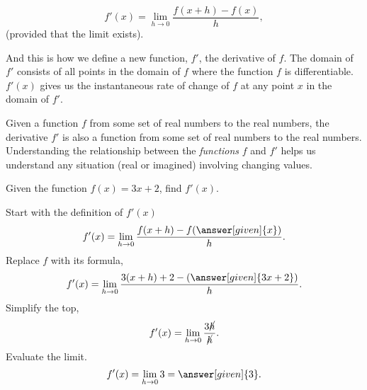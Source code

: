 \documentclass{ximera}
\begin{document}
\[
f'(x) = \lim_{h\to 0}\frac{f(x+h)-f(x)}{h},
\]
(provided that the limit exists).

And this is how we define a new function, $f'$, the derivative of $f$. The domain of $f'$ consists of all points in the domain of $f$ where the function $f$ is differentiable.
$f'(x)$ gives us the instantaneous rate of change of $f$ at any point $x$ in the domain of $f'$.\\
\begin{comment}
\begin{warning}
  The notation:
  \begin{quote}
  $f'(a)$ means take the derivative of $f$ first, then evaluate at
    $x=a$.
  \end{quote}
  In other words, given $f$ a function of $x$
  \[
  f'(a) = \eval{\ddx f(x)}_{x=a}.
  \]
\end{warning}
\end{comment}
Given a function $f$ from  some set of real numbers to the real numbers, the
derivative $f'$ is also a function from some set of real numbers to the real
numbers. Understanding the relationship between the \textit{functions}
$f$ and $f'$ helps us understand any situation (real or imagined)
involving changing values.
\begin{comment}
\begin{question}
  Let $f(x) = 3x+2$. What is $f'(-1)$?
  \begin{multipleChoice}
    \choice{$f'(-1) = 0$ because $f'(3)$ is a number, and a number corresponds to a horizontal line, which has a slope of zero.}
    \choice[correct]{$f'(-1) = 3$ because $y=f(x)$ is a line with slope $3$.}
    \choice{We cannot solve this problem yet.}
  \end{multipleChoice}
\end{question}
\end{comment}
\begin{example}
	Given the function $f(x) = 3x+2$, find  $f'(x)$. \\
	
	\begin{explanation}
		Start with the definition of $f'(x)$
		\[
		f'(x) = \lim_{h\to0}\frac{f(x+h)-f(\answer[given]{x})}{h}.
		\]
		Replace $f$ with its formula,
		\[
		f'(x) = \lim_{h\to0}\frac{3(x+h)+2-\left(\answer[given]{3x+2}\right)}{h}.
		\]
		Simplify the top,
		\[
		f'(x) = \lim_{h\to0}\frac{3\cancel{h}}{\cancel{h}}.
		\]
		Evaluate the limit.		
		\[
		f'(x) = \lim_{h\to0}{3}=\answer[given]{3}.
		\]

		
	\end{explanation}
\end{example}
\end{document}
